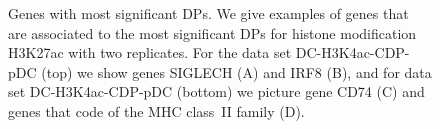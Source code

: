 \begin{figure}[ht]
\begin{center}
\end{center}
\caption[Genes with most significant DPs.]{Genes with most significant DPs.
We give examples of genes that are associated to the most significant DPs for histone modification H3K27ac with two replicates.
For the data set DC-H3K4ac-CDP-pDC (top) we show genes SIGLECH (A) and IRF8 (B), and for data set DC-H3K4ac-CDP-pDC (bottom) we picture gene CD74 (C) and genes that code of the MHC class~II family (D).}
\label{fig_gene_dp_DC}
\end{figure}
